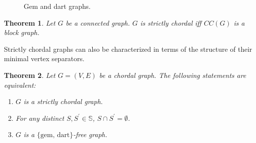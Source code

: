 \documentclass[preprint,12pt]{elsarticle}
\newtheorem{theorem}{Theorem}
\begin{document}
\begin{figure}[h]
\begin{center}
\end{center}
\caption{Gem and dart  graphs.} 
\label{fig:gem-dart}
\end{figure}


\begin{theorem} {\rm\cite{BW10}}\label{theo:BW}
Let $G$ be a connected graph. 
$G$ is strictly chordal iff $CC(G)$ is a block graph.
\end{theorem}

 Strictly chordal graphs  can also be characterized in terms of the structure of their minimal vertex separators. 

\begin{theorem}\label{theo:caract-BD}{\rm \cite{MW15}}
Let  $G=(V,E)$ be a chordal graph.  
The following statements are equivalent: 
\begin{enumerate}
  \item $G$ is a strictly chordal graph.
  \item For any distinct $S, S^{\prime} \in {\mathbb S}$, $S \cap S^{\prime}= \emptyset$.
  \item $G$ is a $\{\textrm{gem, dart}\}$-free graph. 
\end{enumerate}
\end{theorem}
\end{document}
